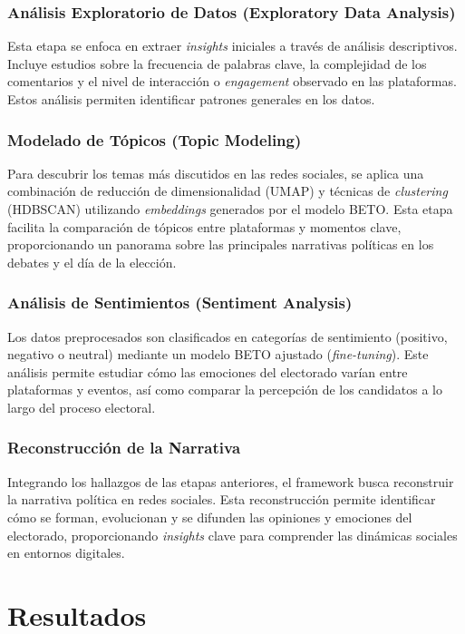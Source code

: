 \documentclass[10pt, a4paper]{article}
\begin{document}
	\subsubsection{Análisis Exploratorio de Datos (Exploratory Data Analysis)}
	Esta etapa se enfoca en extraer \textit{insights} iniciales a través de análisis descriptivos. Incluye estudios sobre la frecuencia de palabras clave, la complejidad de los comentarios y el nivel de interacción o \textit{engagement} observado en las plataformas. Estos análisis permiten identificar patrones generales en los datos.
	
	\subsubsection{Modelado de Tópicos (Topic Modeling)}
	Para descubrir los temas más discutidos en las redes sociales, se aplica una combinación de reducción de dimensionalidad (UMAP) y técnicas de \textit{clustering} (HDBSCAN) utilizando \textit{embeddings} generados por el modelo BETO. Esta etapa facilita la comparación de tópicos entre plataformas y momentos clave, proporcionando un panorama sobre las principales narrativas políticas en los debates y el día de la elección.
	
	\subsubsection{Análisis de Sentimientos (Sentiment Analysis)}
	Los datos preprocesados son clasificados en categorías de sentimiento (positivo, negativo o neutral) mediante un modelo BETO ajustado (\textit{fine-tuning}). Este análisis permite estudiar cómo las emociones del electorado varían entre plataformas y eventos, así como comparar la percepción de los candidatos a lo largo del proceso electoral.
	
	\subsubsection{Reconstrucción de la Narrativa}
	Integrando los hallazgos de las etapas anteriores, el framework busca reconstruir la narrativa política en redes sociales. Esta reconstrucción permite identificar cómo se forman, evolucionan y se difunden las opiniones y emociones del electorado, proporcionando \textit{insights} clave para comprender las dinámicas sociales en entornos digitales.
	
	
	\section{Resultados}
	
\end{document}
